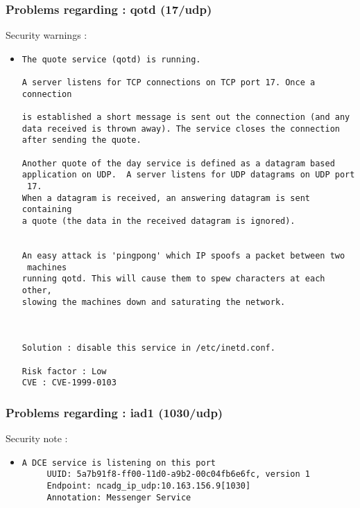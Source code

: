 \documentclass{article}
\begin{document}
\subsubsection{Problems regarding : qotd (17/udp)}
Security warnings :\\
\begin{itemize}
\item \begin{verbatim}
The quote service (qotd) is running.

A server listens for TCP connections on TCP port 17. Once a connection
 
is established a short message is sent out the connection (and any 
data received is thrown away). The service closes the connection 
after sending the quote.

Another quote of the day service is defined as a datagram based
application on UDP.  A server listens for UDP datagrams on UDP port
 17.
When a datagram is received, an answering datagram is sent containing 
a quote (the data in the received datagram is ignored).


An easy attack is 'pingpong' which IP spoofs a packet between two
 machines
running qotd. This will cause them to spew characters at each other,
slowing the machines down and saturating the network.



Solution : disable this service in /etc/inetd.conf.

Risk factor : Low
CVE : CVE-1999-0103
\end{verbatim}\end{itemize}
\subsubsection{Problems regarding : iad1 (1030/udp)}
Security note :\\
\begin{itemize}
\item \begin{verbatim}
A DCE service is listening on this port
     UUID: 5a7b91f8-ff00-11d0-a9b2-00c04fb6e6fc, version 1
     Endpoint: ncadg_ip_udp:10.163.156.9[1030]
     Annotation: Messenger Service


\end{verbatim}\end{itemize}
\end{document}
